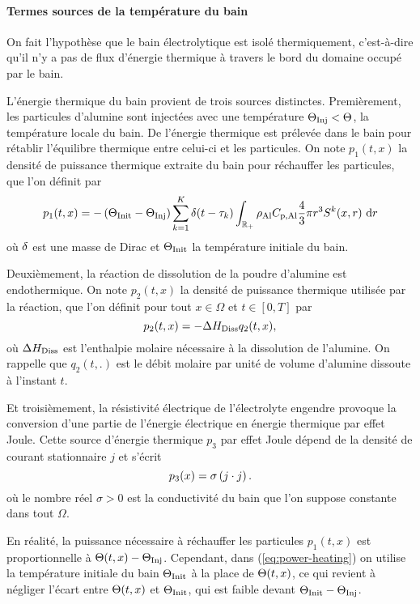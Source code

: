 \paragraph{Termes sources de la température du bain}
On fait l'hypothèse que le bain électrolytique est isolé
thermiquement, c'est-à-dire qu'il n'y a pas de flux d'énergie
thermique à travers le bord du domaine occupé par le bain.

L'énergie thermique du bain provient de trois sources
distinctes. Premièrement, les particules d'alumine sont injectées avec
une température $\Theta_\text{Inj} < \Theta$, la température locale du
bain. De l'énergie thermique est prélevée dans le bain pour rétablir
l'équilibre thermique entre celui-ci et les particules. On note $p_1(t,
x)$ la densité de puissance thermique extraite du bain pour réchauffer
les particules, que l'on définit par
\begin{equation}\label{eq:power-heating}
  p_1(t, x) = -\left( \Theta_\text{Init}-\Theta_\text{Inj} \right)\sum_{k = 1}^{K}\delta(t -
  \tau_k)\int_{\mathbb R_+}\rho_\mathrm{Al}C_{\mathrm{p,Al}}\frac{4}{3}\pi r^3 S^k(x, r)\,\,\mathrm dr
\end{equation}
où $\delta$ est une masse de Dirac et $\Theta_\text{Init}$ la température
initiale du bain.

Deuxièmement, la réaction de dissolution de la poudre d'alumine est
endothermique. On note $p_2(t, x)$ la densité de puissance thermique
utilisée par la réaction, que l'on définit pour tout $x\in\Omega$ et
$t\in[0, T]$ par
\begin{equation}
p_2(t, x) = - \Delta H_\text{Diss} q_2(t, x),
\end{equation}
où $\Delta H_\text{Diss}$ est l'enthalpie molaire nécessaire à
la dissolution de l'alumine. On rappelle que $q_2(t, .)$ est le
débit molaire par unité de volume d'alumine dissoute à l'instant $t$.

Et troisièmement, la résistivité électrique de l'électrolyte engendre
provoque la conversion d'une partie de l'énergie électrique en énergie
thermique par effet Joule. Cette source d'énergie thermique $p_3$ par
effet Joule dépend de la densité de courant stationnaire $j$ et
s'écrit
\begin{equation}\label{eq:p3}
p_3(x) = \sigma\left( j\cdot j \right).
\end{equation}
où le nombre réel $\sigma > 0$ est la conductivité du bain que l'on
suppose constante dans tout $\Omega$.

\begin{remarque}
  En réalité, la puissance nécessaire à réchauffer les particules
  $p_1(t, x)$ est proportionnelle à ${\Theta(t, x) -
    \Theta_\text{Inj}}$. Cependant, dans (\ref{eq:power-heating}) on utilise la
  température initiale du bain $\Theta_\text{Init}$ à la place de
  $\Theta(t, x)$, ce qui revient à négliger l'écart entre
  $\Theta(t, x)$ et $\Theta_\text{Init}$, qui est faible devant ${\Theta_\text{Init} -
  \Theta_\text{Inj}}$.
\end{remarque}

